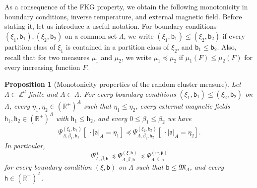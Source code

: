 \documentclass[11pt,a4paper]{article}
\newtheorem{proposition}[theorem]{Proposition}
\theoremstyle{definition}
\numberwithin{equation}{section}
\begin{document}
As a consequence of the FKG property, we obtain the following monotonicity in boundary conditions, inverse temperature, and external magnetic field.
Before stating it, let us introduce a useful notation. For boundary conditions $(\xi_1,\mathsf{b}_1), (\xi_2,\mathsf{b}_2)$ on a common set $\Lambda$, we write $(\xi_1,\mathsf{b}_1) \leq (\xi_2,\mathsf{b}_2)$ if every partition class of $\xi_1$ is contained in a partition class of $\xi_2$, and $\mathsf{b}_1\leq \mathsf{b}_2$. Also, recall that for two measures $\mu_1$ and $\mu_2$, we write $\mu_1 \preccurlyeq \mu_2$ if $\mu_1(F)\leq \mu_2(F)$ for every increasing function $F$.


\begin{proposition}[Monotonicity properties of the random cluster measure]\label{prop:monotonicity_FK}
Let $\Lambda\subset \mathbb{Z}^d$ finite and $A\subset \Lambda$. For every boundary conditions $(\xi_1,\mathsf{b}_1) \leq (\xi_2,\mathsf{b}_2)$ on $\Lambda$, every $\eta_1,\eta_2\in (\mathbb{R}^+)^{A}$ such that $\eta_1\leq \eta_2$, every external magnetic fields $\mathsf{h}_1,\mathsf{h}_2\in (\mathbb R^+)^\Lambda$ with $\mathsf h_1\leq \mathsf h_2$, and every $0\leq\beta_1\leq \beta_2$ we have
\begin{align}
\Psi_{\Lambda,\beta_1,\mathsf h_1}^{(\xi_1,\mathsf{b}_1)}[\:\cdot \mid \mathsf{a}|_A=\eta_1] \preccurlyeq \Psi_{\Lambda,\beta_2,\mathsf h_2}^{(\xi_2,\mathsf{b}_2)}[\:\cdot \mid \mathsf{a}|_A=\eta_2].
\end{align}
In particular, 
\begin{equation}
\Psi^0_{\Lambda,\beta,\mathsf h} \preccurlyeq \Psi_{\Lambda,\beta,\mathsf h}^{(\xi,\mathsf{b})}\preccurlyeq \Psi^{(w,\mathfrak{p})}_{\Lambda,\beta,\mathsf h}  
\end{equation}
for every boundary condition $(\xi,\mathsf{b})$ on $\Lambda$ such that $\mathsf{b}\leq \mathfrak{M}_{\Lambda}$, and every $\mathsf{h}\in(\mathbb R^+)^\Lambda$.
\end{proposition}
\end{document}
